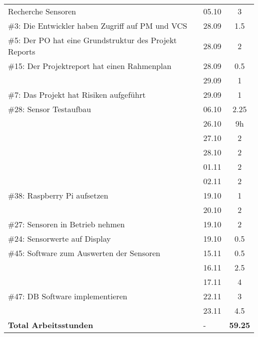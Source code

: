\documentclass[a4paper, 10pt, fleqn]{article}
\newcommand{\footer}{\midrule\textbf{Total Arbeitsstunden}&-&\textbf{59.25}\\\midrule\bottomrule}
\begin{document}
\begin{table}[H]
\begin{tabular}{p{9cm}|p{2cm}|c}
            Recherche Sensoren & 05.10 & 3\\
            \#3: Die Entwickler haben Zugriff auf PM und VCS& 28.09 & 1.5\\
            \#5: Der PO hat eine Grundstruktur des Projekt Reports& 28.09 & 2\\
            \#15: Der Projektreport hat einen Rahmenplan & 28.09 & 0.5\\
            & 29.09 & 1\\
            \#7: Das Projekt hat Risiken aufgeführt & 29.09 & 1\\
            \#28: Sensor Testaufbau & 06.10 & 2.25\\
            & 26.10 & 9h \\
            & 27.10 & 2\\
            & 28.10 & 2\\
            & 01.11 & 2\\
            & 02.11 & 2\\
            \#38: Raspberry Pi aufsetzen & 19.10 & 1\\
            & 20.10 & 2\\
            \#27: Sensoren in Betrieb nehmen & 19.10 & 2\\
            \#24: Sensorwerte auf Display & 19.10 & 0.5\\
            \#45: Software zum Auswerten der Sensoren & 15.11 & 0.5\\
            & 16.11 & 2.5\\
            & 17.11 & 4\\
            \#47: DB Software implementieren & 22.11 & 3\\
            & 23.11 & 4.5\\
            \footer
		\end{tabular}
	\end{table}
\end{document}
